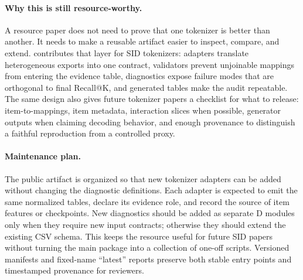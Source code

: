 \paragraph{Why this is still resource-worthy.}
A resource paper does not need to prove that one tokenizer is better than
another. It needs to make a reusable artifact easier to inspect, compare, and
extend. \tool contributes that layer for SID tokenizers: adapters translate
heterogeneous exports into one contract, validators prevent unjoinable mappings
from entering the evidence table, diagnostics expose failure modes that are
orthogonal to final Recall@K, and generated tables make the audit repeatable.
The same design also gives future tokenizer papers a checklist for what to
release: item-to-\sid mappings, item metadata, interaction slices when
possible, generator outputs when claiming decoding behavior, and enough
provenance to distinguish a faithful reproduction from a controlled proxy.

\paragraph{Maintenance plan.}
The public artifact is organized so that new tokenizer adapters can be added
without changing the diagnostic definitions. Each adapter is expected to emit
the same normalized tables, declare its evidence role, and record the source of
item features or checkpoints. New diagnostics should be added as separate D
modules only when they require new input contracts; otherwise they should
extend the existing CSV schema. This keeps the resource useful for future SID
papers without turning the main package into a collection of one-off scripts.
Versioned manifests and fixed-name ``latest'' reports preserve both stable
entry points and timestamped provenance for reviewers.
